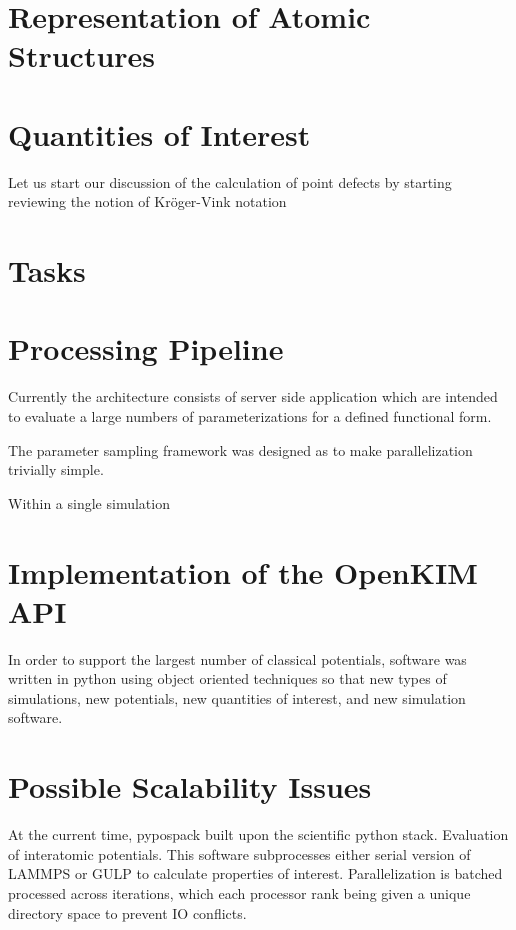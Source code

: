 \section{Representation of Atomic Structures}


\section{Quantities of Interest}

Let us start our discussion of the calculation of point defects by starting reviewing the notion of Kr\"oger-Vink notation\cite{kroger1956_notation}

\section{Tasks}

\section{Processing Pipeline}
Currently the architecture consists of server side application which are intended to evaluate a large numbers of parameterizations for a defined functional form.

The parameter sampling framework was designed as to make parallelization trivially simple.

Within a single simulation

\section{Implementation of the OpenKIM API}

In order to support the largest number of classical potentials, software was written in python using object oriented techniques so that new types of simulations, new potentials, new quantities of interest, and new simulation software.

\section{Possible Scalability Issues}

At the current time, pypospack built upon the scientific python stack.
Evaluation of interatomic potentials.  This software subprocesses either serial version of LAMMPS or GULP to calculate properties of interest.  Parallelization is batched processed across iterations, which each processor rank being given a unique directory space to prevent IO conflicts.

